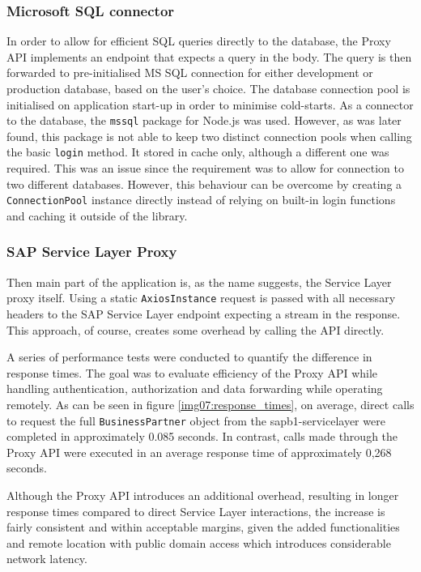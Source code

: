 \subsubsection{Microsoft SQL connector}
In order to allow for efficient SQL queries directly to the database, the Proxy API implements an endpoint that expects a query in the body.
The query is then forwarded to pre-initialised \ac{MS} SQL connection for either development or production database, based on the user's choice. 
The database connection pool is initialised on application start-up in order to minimise cold-starts.
As a connector to the database, the \texttt{\gls{mssql}} package for Node.js was used. However, as was later found, this package is not able to keep two distinct connection pools when calling the basic \texttt{login} method.
It stored in cache only, although a different one was required. This was an issue since the requirement was to allow for connection to two different databases. 
However, this behaviour can be overcome by creating a \texttt{ConnectionPool} instance directly instead of relying on built-in login functions and caching it outside of the library.

\subsubsection{SAP Service Layer Proxy}
Then main part of the application is, as the name suggests, the Service Layer proxy itself. 
Using a static \texttt{\gls{AxiosInstance}} request is passed with all necessary headers to the SAP Service Layer endpoint expecting a stream in the response.
This approach, of course, creates some overhead by calling the API directly. 

A series of performance tests were conducted to quantify the difference in response times. 
The goal was to evaluate efficiency of the Proxy API while handling authentication, authorization and data forwarding while operating remotely. 
As can be seen in figure \ref{img07:response_times}, on average, direct calls to request the full \texttt{BusinessPartner} object from the \gls{sapb1-servicelayer} were completed in approximately 0.085 seconds. 
In contrast, calls made through the Proxy API were executed in an average response time of approximately 0,268 seconds.

Although the Proxy API introduces an additional overhead, resulting in longer response times compared to direct Service Layer interactions, the increase is fairly consistent and within acceptable margins, given the added functionalities and remote location with public domain access which introduces considerable network latency.
%

